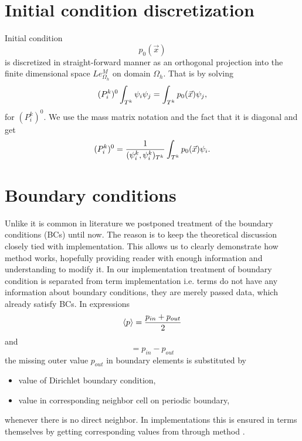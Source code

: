 \section{Initial condition discretization}
Initial condition 
$$
p_0(\vec{x})
$$
is discretized in straight-forward manner as an orthogonal projection into the 
finite dimensional space $Le_{\Omega_h}^{M}$ on domain $\Omega_h$. That is
by solving
\begin{equation}\label{eq:init_proj}
    (P^k_i)^0\int_{T^k}\psi_i\psi_j = \int_{T^k} p_0(\vec{x})\psi_j,
\end{equation}
for $(P^k_i)^0$. We use the mass matrix notation and the fact that 
it is diagonal and get
\begin{equation}
    (P^k_i)^0 = \frac{1}{(\psi^k_i,\psi^k_i)_{T^k}}\int_{T^k} p_0(\vec{x})\psi_i.
\end{equation}




\section{Boundary conditions}
Unlike it is common in literature we postponed treatment of the boundary 
conditions (BCs) until now. The reason is to keep the theoretical discussion 
closely tied with implementation. This allows us to clearly demonstrate how 
method works, hopefully providing reader with enough information and 
understanding to modify it. In our implementation treatment of boundary 
condition is separated from term implementation i.e. terms do not have any 
information about boundary conditions, they are merely passed data, which 
already satisfy BCs.
In expressions
\begin{equation}
      \langle p\rangle = \frac{p_{in} + p_{out}}{2}
\end{equation}
and 
\begin{equation}
    [p] = p_{in} - p_{out}
\end{equation}
the missing outer value $p_{out}$ in boundary elements is substituted by
\begin{itemize}
    \item value of Dirichlet boundary condition, 
    \item value in corresponding neighbor cell on periodic boundary,
\end{itemize} 
whenever there is no direct neighbor.
In implementations this is ensured in terms themselves by getting corresponding values 
from  through method .

